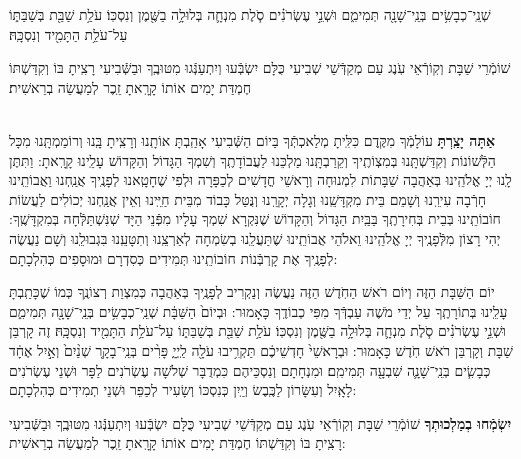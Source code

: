 \documentclass[twoside, openany, parskip=half, 11pt]{book}
\begin{document}
 
שְׁנֵֽי־כְבָשִׂ֥ים בְּנֵֽי־שָׁנָ֖ה תְּמִימִ֑ם וּשְׁנֵ֣י עֶשְׂרֹנִ֗ים סֹ֧לֶת מִנְחָ֛ה בְּלוּלָ֥ה בַשֶּׁ֖מֶן וְנִסְכּֽוֹ׃ עֹלַ֥ת שַׁבַּ֖ת בְּשַׁבַּתּ֑וֹ עַל־עֹלַ֥ת הַתָּמִ֖יד וְנִסְכָּֽהּ׃

 שׁוֹמְֿרֵי שַׁבָּת וְקֽוֹרְֿאֵי עֹֽנֶג עַם מְקַדְּֿשֵׁי שְׁבִיעִי כֻּלָּם יִשְׂבְּֿעוּ וְיִתְעַנְּֿגוּ מִטּוּבֶֽךָ וּבַשְּֿׁבִיעִי רָצִֽיתָ בּוֹ וְקִדַּשְׁתּוֹ חֶמְדַּת יָמִים אוֹתוֹ קָרָֽאתָ זֵֽכֶר לְמַעֲשֵׂה בְרֵאשִׁית׃

\shabboskiddushhayom {}

\begin{sometimes}

\label{shabbosroshchodesh}
\\
\textbf{אַתָּה יָצַֽרְתָּ}
 עוֹלָמְֿךָ מִקֶּֽדֶם כִּלִּֽיתָ מְלַאכְתְּֿךָ בַּיוֹם הַשְּֿׁבִיעִי אָהַֽבְתָּ אוֹתָֽנוּ וְרָצִֽיתָ בָּֽנוּ וְרוֹמַמְתָּֽנוּ מִכָּל הַלְּֿשׁוֹנוֹת וְקִדַּשְׁתָּֽנוּ בְּמִצְוֹתֶֽיךָ וְקֵרַבְתָּֽנוּ מַלְכֵּנוּ לַעֲבוֹדָתֶֽךָ וְשִׁמְךָ הַגָּדוֹל וְהַקָּדוֹשׁ עָלֵֽינוּ קָרָֽאתָ: וַתִּתֶּן לָֽנוּ יְיָ אֱלֹהֵֽינוּ בְּאַהֲבָה שַׁבָּתוֹת לִמְנוּחָה וְרָאשֵׁי חֳדָשִׁים לְכַפָּרָה וּלְפִי שֶׁחָטָֽאנוּ לְפָנֶֽיךָ אֲנַֽחְנוּ וַאֲבוֹתֵֽינוּ חָרְֿבָה עִירֵֽנוּ וְשָׁמֵם בֵּית מִקְדָּשֵֽׁנוּ וְגָלָה יְקָרֵֽנוּ וְנֻּטַּל כָּבוֹד מִבֵּית חַיֵּֽינוּ וְאֵין אֲנַֽחְנוּ יְכוֹלִים לַעֲשׂוֹת חוֹבוֹתֵֽינוּ בְּבֵית בְּחִירָתֶֽךָ בַּבַּֽיִת הַגָּדוֹל וְהַקָּדוֹשׁ שֶׁנִּקְרָא שִׁמְךָ עָלָיו מִפְּֿנֵי הַיָּד שְׁנִּשְׁתַּלְּֿחָה בְּמִקְדָּשֶֽׁךָ: יְהִי רָצוֹן מִלְּֿפָנֶֽיךָ יְיָ אֱלֹהֵֽינוּ וֵאלֹהֵי אֲבוֹתֵֽינוּ שֶׁתַּעֲלֵֽנוּ בְשִׂמְחָה לְאַרְצֵֽנוּ וְתִטָּעֵֽנוּ בִּגְבוּלֵֽנוּ וְשָׁם נַעֲשֶׂה לְפָנֶֽיךָ אֶת קָרְבְּֿנוֹת חוֹבוֹתֵֽינוּ תְּמִידִים כְּסִדְרָם וּמוּסָפִים כְּהִלְכָתָם: 
 
 יוֹם הַשַּׁבָּת הַזֶּה וְיוֹם רֹאשׁ הַחֹֽדֶשׁ הַזֶּה נַעֲשֶׂה וְנַקְרִיב לְפָנֶֽיךָ בְּאַהֲבָה כְּמִצְוַת רְצוֹנֶֽךָ כְּמוֹ שֶׁכָּתַֽבְתָּ עָלֵֽינוּ בְּתוֹרָתֶֽךָ עַל יְדֵי מֹשֶׁה עַבְדְּֿךָ מִפִּי כְבוֹדֶֽךָ כָּאָמוּר: וּבְיוֹם֙  הַשַּׁבָּ֔ת שְׁנֵֽי־כְבָשִׂ֥ים בְּנֵֽי־שָׁנָ֖ה תְּמִימִ֑ם וּשְׁנֵ֣י עֶשְׂרֹנִ֗ים סֹ֧לֶת מִנְחָ֛ה בְּלוּלָ֥ה בַשֶּׁ֖מֶן וְנִסְכּֽוֹ׃ עֹלַ֥ת שַׁבַּ֖ת בְּשַׁבַּתּ֑וֹ עַל־עֹלַ֥ת הַתָּמִ֖יד וְנִסְכָּֽהּ׃ זֶה קָרְבַּן שַׁבָּת וְקָרְבַּן רֹאשׁ חֹֽדֶשׁ כָּאָמוּר: וּבְרָאשֵׁי֙  חָדְשֵׁיכֶ֔ם תַּקְרִ֥יבוּ עֹלָ֖ה לַֽיְיָ֑ פָּרִ֨ים בְּנֵֽי־בָקָ֤ר שְׁנַ֨יִם֙ וְאַ֣יִל אֶחָ֔ד כְּבָשִׂ֧ים בְּנֵֽי־שָׁנָ֛ה שִׁבְעָ֖ה תְּמִימִֽם׃ וּמִנְחָתָם וְנִסְכֵּיהֶם כִּמְדֻבָּר שְׁלֹשָׁה עֶשְׂרֹנִים לַפָּר וּשְׁנֵי עֶשְׂרֹנִים לָאָֽיִל וְעִשָּׂרוֹן לַכֶּֽבֶשׂ וְיַֽיִן כְּנִסְכּוֹ וְשָׂעִיר לְכַפֵּר וּשְׁנֵי תְמִידִים כְּהִלְכָתָם:

\textbf{יִשְׂמְֿחוּ בְמַלְכוּתְךָ}
 שׁוֹמְֿרֵי שַׁבָּת וְקֽוֹרְֿאֵי עֹֽנֶג עַם מְקַדְּֿשֵׁי שְׁבִיעִי כֻּלָּם יִשְׂבְּֿעוּ וְיִתְעַנְּֿגוּ מִטּוּבֶֽךָ וּבַשְּֿׁבִיעִי רָצִֽיתָ בּוֹ וְקִדַּשְׁתּוֹ חֶמְדַּת יָמִים אוֹתוֹ קָרָֽאתָ זֵֽכֶר לְמַעֲשֵׂה בְרֵאשִׁית:
 

\end{sometimes}
\end{document}
